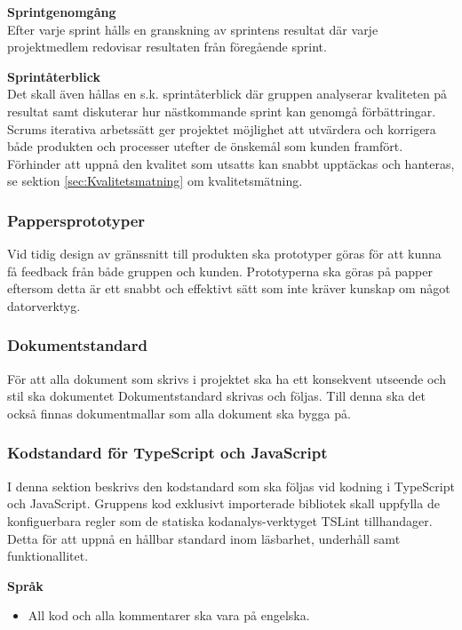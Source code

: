 \documentclass[a4paper,10pt]{article}
\begin{document}
\textbf{Sprintgenomgång}\\
Efter varje sprint hålls en granskning av sprintens resultat där varje projektmedlem redovisar resultaten från föregående sprint.

\textbf{Sprintåterblick}\\
Det skall även hållas en s.k. sprintåterblick där gruppen analyserar kvaliteten på resultat samt diskuterar hur nästkommande sprint kan genomgå förbättringar.
Scrums iterativa arbetssätt ger projektet möjlighet att utvärdera och korrigera både produkten och processer utefter de önskemål som kunden framfört. Förhinder att uppnå den kvalitet som utsatts kan snabbt upptäckas och hanteras, se sektion \ref{sec:Kvalitetsmatning} om kvalitetsmätning.

\subsubsection{Pappersprototyper}
Vid tidig design av gränssnitt till produkten ska prototyper göras för att kunna få feedback från både gruppen och kunden. Prototyperna ska göras på papper eftersom detta är ett snabbt och effektivt sätt som inte kräver kunskap om något datorverktyg.

\subsubsection{Dokumentstandard}
För att alla dokument som skrivs i projektet ska ha ett konsekvent utseende och stil ska dokumentet Dokumentstandard skrivas och följas. Till denna ska det också finnas dokumentmallar som alla dokument ska bygga på.

\subsubsection{Kodstandard för TypeScript och JavaScript}
\label{sec:kodstandard}
I denna sektion beskrivs den kodstandard som ska följas vid kodning i TypeScript och JavaScript.
Gruppens kod exklusivt importerade bibliotek skall uppfylla de konfiguerbara regler som de statiska kodanalys-verktyget TSLint tillhandager.
Detta för att uppnå en hållbar standard inom läsbarhet, underhåll samt funktionallitet.

\textbf{Språk}
\begin{itemize}
\item All kod och alla kommentarer ska vara på engelska.
\end{itemize}
\end{document}
